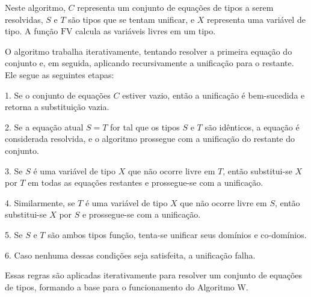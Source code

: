 Neste algoritmo, $C$ representa um conjunto de equações de tipos a serem resolvidas, $S$ e $T$ são tipos que se tentam unificar, e $X$ representa uma variável de tipo.
A função $\text{FV}$ calcula as variáveis livres em um tipo.

O algoritmo trabalha iterativamente, tentando resolver a primeira equação do conjunto e, em seguida, aplicando recursivamente a unificação para o restante.
Ele segue as seguintes etapas:

1. Se o conjunto de equações $C$ estiver vazio, então a unificação é bem-sucedida e retorna a substituição vazia.

2. Se a equação atual $S = T$ for tal que os tipos $S$ e $T$ são idênticos, a equação é considerada resolvida, e o algoritmo prossegue com a unificação do restante do conjunto.

3. Se $S$ é uma variável de tipo $X$ que não ocorre livre em $T$, então substitui-se $X$ por $T$ em todas as equações restantes e prossegue-se com a unificação.

4. Similarmente, se $T$ é uma variável de tipo $X$ que não ocorre livre em $S$, então substitui-se $X$ por $S$ e prossegue-se com a unificação.

5. Se $S$ e $T$ são ambos tipos função, tenta-se unificar seus domínios e co-domínios.

6. Caso nenhuma dessas condições seja satisfeita, a unificação falha.

Essas regras são aplicadas iterativamente para resolver um conjunto de equações de tipos, formando a base para o funcionamento do Algoritmo W.

